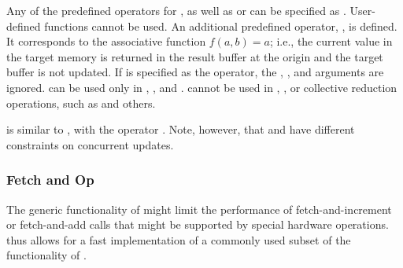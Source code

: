 Any of the predefined operators for ,
as well as
 or  can be specified as
.  User-defined functions cannot be used. 
%
An additional predefined operator, , is defined.
It corresponds to the associative function $f(a,b) = a$; i.e., the current
value in the target memory is returned in the result buffer at the
origin and the target buffer is not updated.
%
If  is specified as the operator, the
,
, and  arguments are ignored.
 can be used only in ,
, and .
 cannot be used
in , , or collective
reduction operations, such as  and others.

\begin{users}
 is similar to 
,
with the  operator .
Note, however, that  and
have different constraints on concurrent updates.
\end{users}

\subsubsection{Fetch and Op}
\label{sec:1sided-fetchandop}

The generic functionality of  might
limit the performance of fetch-and-increment or fetch-and-add
calls that might be supported by special hardware operations.
 thus allows for a fast implementation of
a commonly used subset of the functionality of
.

